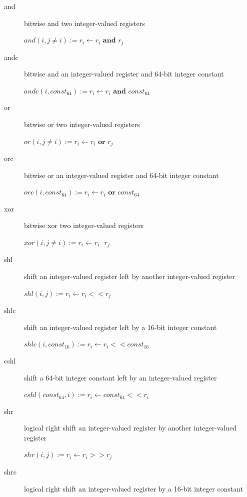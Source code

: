 \documentclass[english,a4paper]{article}
\begin{document}
\begin{description}
\item[and] bitwise and two integer-valued registers
  
  $and(i, j\neq i) := r _{i} \longleftarrow  r _{i}  \textbf{ and } r _{j} $ \\
\item[andc] bitwise and an integer-valued register and 64-bit integer
  constant
  
  $andc(i, const _{64}) :=  r _{i} \longleftarrow  r _{i} \textbf{ and } const _{64} $ \\
\item[or] bitwise or two integer-valued registers
  
  $or(i, j \neq i) := r _{i} \longleftarrow  r _{i} \textbf{ or } r _{j} $  \\
\item[orc] bitwise or an integer-valued register and 64-bit integer
  constant
  
  $orc(i, const _{64}) :=  r _{i} \longleftarrow  r _{i} \textbf{ or } const _{64} $ \\
\item[xor] bitwise xor two integer-valued registers
  
  $xor(i, j \neq i) := r _{i} \longleftarrow  r _{i} \textbf{ \^{} } r _{j} $ \\
\item[shl] shift an integer-valued register left by another
  integer-valued register
  
  $shl(i, j) := r _{i} \longleftarrow  r _{i} << r _{j} $ \\
\item[shlc] shift an integer-valued register left by a 16-bit integer
  constant
  
  $shlc(i, const _{16}) :=  r _{i} \longleftarrow  r _{i} << const _{16} $ \\
\item[cshl] shift a 64-bit integer constant left by an integer-valued
  register
  
  $cshl(const _{64}, i):=  r _{i} \longleftarrow  const _{64} << r _{i}  $ \\
\item[shr] logical right shift an integer-valued register by another
  integer-valued register
  
  $shr(i, j) := r _{i} \longleftarrow  r _{i} >> r _{j} $ \\
\item[shrc] logical right shift an integer-valued register by a 16-bit
  integer constant
  

\end{description}
\end{document}
